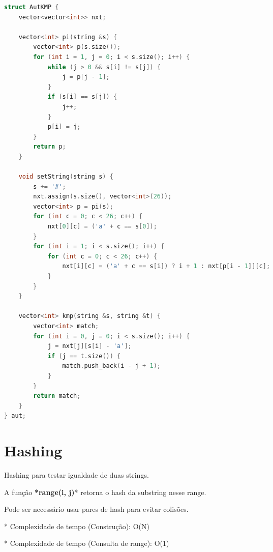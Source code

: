 \documentclass[11pt, a4paper, oneside]{book}
\begin{document}
\hfill

\begin{multicols}{2}
\begin{lstlisting}[language=C++]
struct AutKMP {
    vector<vector<int>> nxt;

    vector<int> pi(string &s) {
        vector<int> p(s.size());
        for (int i = 1, j = 0; i < s.size(); i++) {
            while (j > 0 && s[i] != s[j]) {
                j = p[j - 1];
            }
            if (s[i] == s[j]) {
                j++;
            }
            p[i] = j;
        }
        return p;
    }

    void setString(string s) {
        s += '#';
        nxt.assign(s.size(), vector<int>(26));
        vector<int> p = pi(s);
        for (int c = 0; c < 26; c++) {
            nxt[0][c] = ('a' + c == s[0]);
        }
        for (int i = 1; i < s.size(); i++) {
            for (int c = 0; c < 26; c++) {
                nxt[i][c] = ('a' + c == s[i]) ? i + 1 : nxt[p[i - 1]][c];
            }
        }
    }

    vector<int> kmp(string &s, string &t) {
        vector<int> match;
        for (int i = 0, j = 0; i < s.size(); i++) {
            j = nxt[j][s[i] - 'a'];
            if (j == t.size()) {
                match.push_back(i - j + 1);
            }
        }
        return match;
    }
} aut;
\end{lstlisting}
\end{multicols}

\hfill

\section{Hashing}


Hashing para testar igualdade de duas strings.



A função \textbf{*range(i, j)}* retorna o hash da substring nesse range.   

Pode ser necessário usar pares de hash para evitar colisões.



* Complexidade de tempo (Construção): O(N)

* Complexidade de tempo (Consulta de range): O(1)

\hfill
\end{document}
